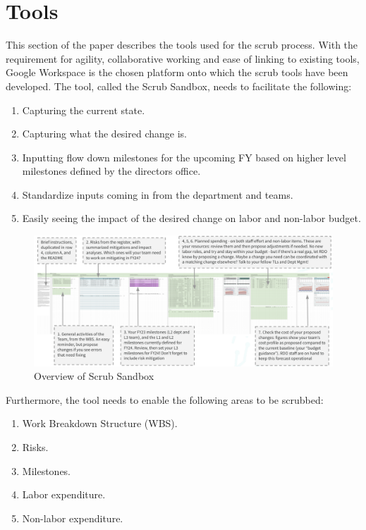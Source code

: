 \section{Tools} \label{sec:tools}

This section of the paper describes the tools used for the scrub process. With the requirement for agility, collaborative working and ease of linking to existing tools, Google Workspace  is the chosen platform onto which the scrub tools have been developed. The tool, called the Scrub Sandbox,  needs to facilitate the following:

\begin{enumerate}
\item Capturing the current state.
\item Capturing what the desired change is.
\item Inputting flow down milestones for the upcoming FY based on higher level milestones defined by the directors office.
\item Standardize inputs coming in from the department and teams.
\item Easily seeing the impact of the desired change on labor and non-labor budget.
\end{enumerate}

\begin{figure}[h!]
\begin{centering}
\includegraphics[width=1.0\textwidth]{Figure3OverviewScrubSandbox}
	\caption{ Overview of Scrub Sandbox
\label{fig:sandbox}}
\end{centering}
\end{figure}


Furthermore, the tool needs to enable the following areas to be scrubbed:
\begin{enumerate}
\item Work Breakdown Structure (WBS).
\item Risks.
\item Milestones.
\item Labor expenditure.
\item Non-labor expenditure.
\end{enumerate}

